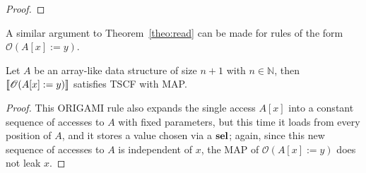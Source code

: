 \begin{proof}
%     
    
\end{proof}

A similar argument to Theorem~\ref{theo:read} can be made for rules of the form $\mathscr{O}(A[x]:=y)$.
\begin{theorem}
    \label{theo:write}
    Let $A$ be an array-like data structure of size $n+1$ with $n\in \mathbb{N}$, then $\llbracket \mathscr{O}(A[x]:=y)\rrbracket$ satisfies TSCF with MAP.
\end{theorem}
\begin{proof}
    This ORIGAMI rule also expands the single access $A[x]$ into a constant sequence of accesses to $A$ with fixed parameters, but this time it loads from every position of $A$, and it stores a value chosen via a $\textbf{sel}$; again, since this new sequence of accesses to $A$ is independent of $x$, the MAP of $\mathscr{O}(A[x]:=y)$ does not leak $x$. 


\end{proof}
